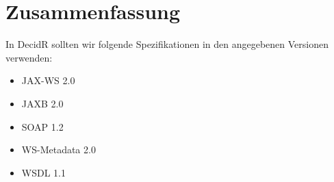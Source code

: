 \documentclass[runningheads]{llncs}
\newcommand{\decidr}{DecidR}
\begin{document}
  \label{summary}
  \section{Zusammenfassung}
    In \decidr{} sollten wir folgende Spezifikationen in den angegebenen Versionen verwenden:
    \begin{itemize}
      \item JAX-WS 2.0
      \item JAXB 2.0
      \item SOAP 1.2
      \item WS-Metadata 2.0
      \item WSDL 1.1
    \end{itemize}


  \newpage

  \newpage
  \begin{flushleft}
    
    
  \end{flushleft}
\end{document}

